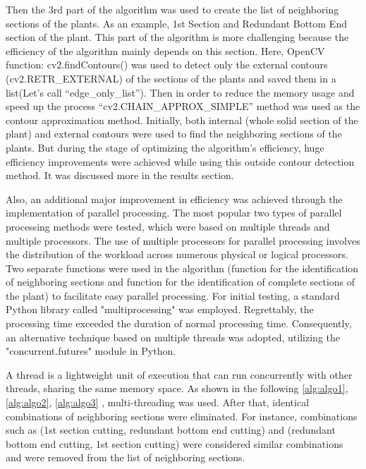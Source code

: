 \documentclass[]{iat}
\begin{document}
Then the 3rd part of the algorithm was used to create the list of neighboring sections of the plants. As an example, 1st Section and Redundant Bottom End section of the plant. This part of the algorithm is more challenging because the efficiency of the algorithm mainly depends on this section. Here, OpenCV function: cv2.findContours() was used to detect only the external contours (cv2.RETR\_EXTERNAL) of the sections of the plants and saved them in a list(Let’s call “edge\_only\_list”). Then in order to reduce the memory usage and speed up the process “cv2.CHAIN\_APPROX\_SIMPLE” method was used as the contour approximation method. Initially, both internal (whole solid section of the plant) and external contours were used to find the neighboring sections of the plants. But during the stage of optimizing the algorithm’s efficiency, huge efficiency improvements were achieved while using this outside contour detection method. It was discussed more in the results section.
\par
Also, an additional major improvement in efficiency was achieved through the implementation of parallel processing. The most popular two types of parallel processing methods were tested, which were based on multiple threads and multiple processors. The use of multiple processors for parallel processing involves the distribution of the workload across numerous physical or logical processors. Two separate functions were used in the algorithm (function for the identification of neighboring sections and function for the identification of complete sections of the plant) to facilitate easy parallel processing. For initial testing, a standard Python library called "multiprocessing" was employed. Regrettably, the processing time exceeded the duration of normal processing time. Consequently, an alternative technique based on multiple threads was adopted, utilizing the "concurrent.futures" module in Python.
\par
A thread is a lightweight unit of execution that can run concurrently with other threads, sharing the same memory space. As shown in the following  \autoref{alg:algo1}, \autoref{alg:algo2},  \autoref{alg:algo3} , multi-threading was used. After that, identical combinations of neighboring sections were eliminated. For instance, combinations such as (1st section cutting, redundant bottom end cutting) and (redundant bottom end cutting, 1st section cutting) were considered similar combinations and were removed from the list of neighboring sections.
\par
\FloatBarrier
\end{document}
